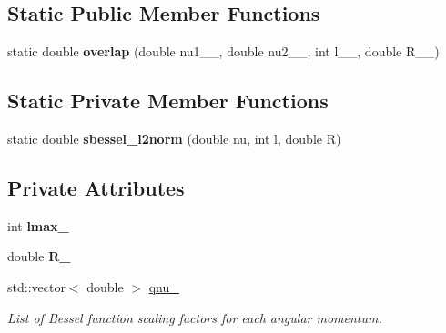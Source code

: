 \subsection*{Static Public Member Functions}
\begin{DoxyCompactItemize}
\item 
\hypertarget{classsirius_1_1_spherical___bessel__approximant2_a7a22f3865d8464375ae1a05ea338cce5}{}static double {\bfseries overlap} (double nu1\+\_\+\+\_\+, double nu2\+\_\+\+\_\+, int l\+\_\+\+\_\+, double R\+\_\+\+\_\+)\label{classsirius_1_1_spherical___bessel__approximant2_a7a22f3865d8464375ae1a05ea338cce5}

\end{DoxyCompactItemize}
\subsection*{Static Private Member Functions}
\begin{DoxyCompactItemize}
\item 
\hypertarget{classsirius_1_1_spherical___bessel__approximant2_af397a0cc84da4fc9ecb9105af8291059}{}static double {\bfseries sbessel\+\_\+l2norm} (double nu, int l, double R)\label{classsirius_1_1_spherical___bessel__approximant2_af397a0cc84da4fc9ecb9105af8291059}

\end{DoxyCompactItemize}
\subsection*{Private Attributes}
\begin{DoxyCompactItemize}
\item 
\hypertarget{classsirius_1_1_spherical___bessel__approximant2_a3a0204dc63c28f94f766e5b19021588d}{}int {\bfseries lmax\+\_\+}\label{classsirius_1_1_spherical___bessel__approximant2_a3a0204dc63c28f94f766e5b19021588d}

\item 
\hypertarget{classsirius_1_1_spherical___bessel__approximant2_a7ffee8d2ffd4d9db8b1d076a70cad253}{}double {\bfseries R\+\_\+}\label{classsirius_1_1_spherical___bessel__approximant2_a7ffee8d2ffd4d9db8b1d076a70cad253}

\item 
std\+::vector$<$ double $>$ \hyperlink{classsirius_1_1_spherical___bessel__approximant2_a6f53e316d96391172e7e860936a8672f}{qnu\+\_\+}
\begin{DoxyCompactList}\small\item\em List of Bessel function scaling factors for each angular momentum. \end{DoxyCompactList}\end{DoxyCompactItemize}


